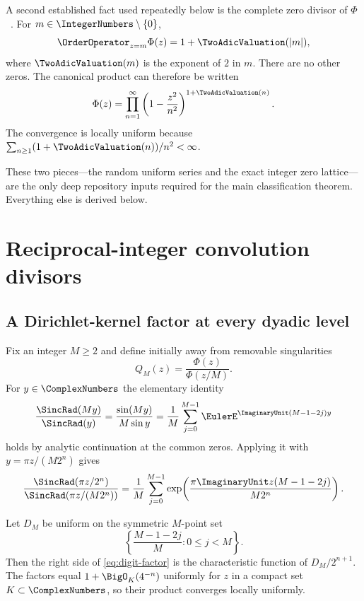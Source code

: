 \documentclass[11pt,oneside]{article}
\theoremstyle{definition}
\theoremstyle{remark}
\begin{document}
A second established fact used repeatedly below is the complete zero divisor of $\Phi$~\cite{ProveItPrimary}.
For $m\in\IntegerNumbers\setminus\{0\}$,
\begin{equation}
 \OrderOperator_{z=m}\Phi(z)=1+\TwoAdicValuation(|m|),
 \label{eq:Phi-zero-order}
\end{equation}
where $\TwoAdicValuation(m)$ is the exponent of $2$ in $m$.  There are no other zeros.  The
canonical product can therefore be written
\begin{equation}
 \Phi(z)=\prod_{n=1}^{\infty}
 \left(1-\frac{z^2}{n^2}\right)^{1+\TwoAdicValuation(n)}.
 \label{eq:Phi-canonical}
\end{equation}
The convergence is locally uniform because
$\sum_{n\ge1}(1+\TwoAdicValuation(n))/n^2<\infty$.

These two pieces---the random uniform series and the exact integer zero lattice---are the
only deep repository inputs required for the main classification theorem.  Everything else
is derived below.

\section{Reciprocal-integer convolution divisors}
\label{sec:divisors}

\subsection{A Dirichlet-kernel factor at every dyadic level}

Fix an integer $M\ge2$ and define initially away from removable singularities
\begin{equation}
 Q_M(z)=\frac{\Phi(z)}{\Phi(z/M)}.
 \label{eq:QM-quotient}
\end{equation}
For $y\in\ComplexNumbers$ the elementary identity
\begin{equation}
 \frac{\SincRad(My)}{\SincRad(y)}
 =\frac{\sin(My)}{M\sin y}
 =\frac1M\sum_{j=0}^{M-1}\EulerE^{\ImaginaryUnit(M-1-2j)y}
 \label{eq:Dirichlet-kernel}
\end{equation}
holds by analytic continuation at the common zeros.  Applying it with
$y=\pi z/(M2^n)$ gives
\begin{equation}
 \frac{\SincRad(\pi z/2^n)}{\SincRad(\pi z/(M2^n))}
 =\frac1M\sum_{j=0}^{M-1}
 \exp\!\left(\frac{\pi\ImaginaryUnit z(M-1-2j)}{M2^n}\right).
 \label{eq:digit-factor}
\end{equation}

Let $D_M$ be uniform on the symmetric $M$-point set
\begin{equation}
 \left\{\frac{M-1-2j}{M}:0\le j<M\right\}.
 \label{eq:DM}
\end{equation}
Then the right side of \eqref{eq:digit-factor} is the characteristic function of
$D_M/2^{n+1}$.  The factors equal $1+\BigO_K(4^{-n})$ uniformly for $z$ in a
compact set $K\subset\ComplexNumbers$, so their product converges locally uniformly.
\end{document}
